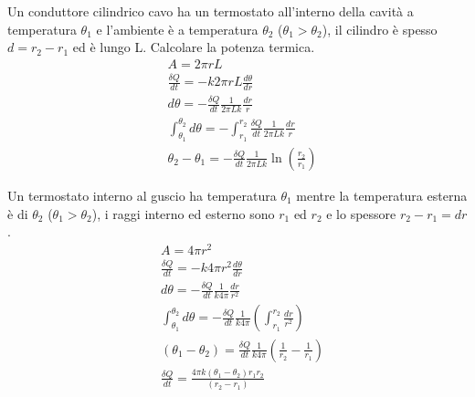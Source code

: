 \documentclass[
10pt, %
a4paper, %
oneside, %
headinclude,footinclude, %
BCOR5mm, %
]{scrartcl}
\begin{document}
\begin{exercise}
	Un conduttore cilindrico cavo ha un termostato all'interno della cavità a temperatura $\theta_1$ e l'ambiente è a temperatura $\theta_2$ ($\theta_1 > \theta_2$), il cilindro è spesso \(d = r_2-r_1\) ed è lungo L. Calcolare la potenza termica. 
	\begin{align*}
		&A = 2\pi r L\\
		&\frac{\delta Q}{dt} = -k 2 \pi r L \frac{d\theta}{d r}\\
		&d\theta = -\frac{\delta Q}{d t}\frac{1}{2\pi L k}\frac{dr}{r}\\
		&\int_{\theta_1}^{\theta_2} d\theta = - \int_{r_1}^{r_2}  \frac{\delta Q}{d t}\frac{1}{2\pi L k}\frac{dr}{r}\\
		&\theta_2 - \theta_1 = -\frac{\delta Q}{d t}\frac{1}{2\pi L k}\ln\left(\frac{r_2}{r_1}\right)
	\end{align*}
\end{exercise}
\begin{exercise}
	Un termostato interno al guscio ha temperatura $\theta_1$ mentre la temperatura esterna è di $\theta_2$ (\(\theta_1 > \theta_2\)), i raggi interno ed esterno sono $r_1$ ed $r_2$ e lo spessore \(r_2-r_1 = dr\).
	\begin{align*}
		&A = 4 \pi r^2\\
		&\frac{\delta Q }{dt} = -k 4\pi r^2 \frac{d\theta}{dr}\\
		&d \theta = -\frac{\delta Q }{dt} \frac{1}{k 4 \pi}\frac{dr}{r^2}\\
		&\int_{\theta_1}^{\theta_2}d\theta = -\frac{\delta Q }{dt} \frac{1}{k 4 \pi} \left(\int_{r_1}^{r_2}\frac{dr}{r^2}\right)\\
		&(\theta_1 - \theta_2) = \frac{\delta Q }{dt} \frac{1}{k 4 \pi}\left(\frac{1}{r_2}-\frac{1}{r_1}\right)\\
		&\frac{\delta Q }{dt} = \frac{4\pi k (\theta_1-\theta_2)r_1 r_2}{(r_2 - r_1)}
	\end{align*}
\end{exercise}
\end{document}
